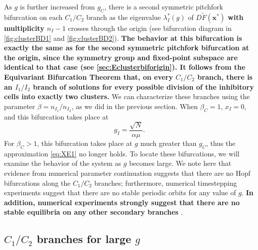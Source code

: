 \documentclass[reqno]{siamonline190516}
\newcommand{\xvec}{\mathbf{x}}
\newcommand{\revised}[1]{ \textbf{#1} }
\begin{document}
As $g$ is further increased from $g_C$, there is a second symmetric pitchfork bifurcation on each $C_1/C_2$ branch as the eigenvalue $\lambda_I^*(g)$ of $D\tilde{F}(\xvec^*)$ \revised{with multiplicity $n_I-1$} crosses through the origin (see bifurcation diagram in \cref{fig:clusterBD1} and \cref{fig:clusterBD2}). 
\revised{
The behavior at this bifurcation is exactly the same as for the second symmetric pitchfork bifurcation at the origin, since the symmetry group and fixed-point subspace are identical to that case (see \cref{sec:Eclusterbiforigin}). It follows from the Equivariant Bifurcation Theorem that, on every $C_1/C_2$ branch, there is an $I_1/I_2$ branch of solutions for every possible division of the inhibitory cells into exactly two clusters. 
}
We can characterize these branches using the parameter $\beta = n_{I_1}/n_{I_2}$, as we did in the previous section. When $\beta_C = 1$, $x_I = 0$, and this bifurcation takes place at 
\begin{equation}\label{eq:gpitchinhbeta1}
g_I = \frac{\sqrt{N}}{\alpha \mu}.
\end{equation}
For $\beta_C > 1$, this bifurcation takes place at $g$ much greater than $g_C$, thus the approximation \cref{eq:XE1} no longer holds. To locate these bifurcations, we will examine the behavior of the system as $g$ becomes large. We note here that evidence from numerical parameter continuation suggests that there are no Hopf bifurcations along the $C_1/C_2$ branches; furthermore, numerical timestepping experiments suggest that there are no stable periodic orbits for any value of $g$. \revised{In addition, numerical experiments strongly suggest that there are no stable equilibria on any other secondary branches}.

\subsection{\texorpdfstring{$C_1/C_2$}{C1/C2} branches for large \texorpdfstring{$g$}{g}} 
\end{document}
